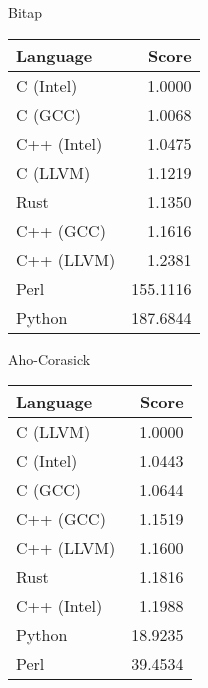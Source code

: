 \begin{subtable}{0.33\textwidth}
    \centering
    \caption{Bitap}
    \label{table:runtime:shift_or}
    \begin{tabular}{|l|r|}
        \hline
        Language & Score \\
        \hline
        C (Intel) & 1.0000 \\
        C (GCC) & 1.0068 \\
        C++ (Intel) & 1.0475 \\
        C (LLVM) & 1.1219 \\
        Rust & 1.1350 \\
        C++ (GCC) & 1.1616 \\
        C++ (LLVM) & 1.2381 \\
        Perl & 155.1116 \\
        Python & 187.6844 \\
        \hline
    \end{tabular}
\end{subtable}
\begin{subtable}{0.33\textwidth}
    \centering
    \caption{Aho-Corasick}
    \label{table:runtime:aho_corasick}
    \begin{tabular}{|l|r|}
        \hline
        Language & Score \\
        \hline
        C (LLVM) & 1.0000 \\
        C (Intel) & 1.0443 \\
        C (GCC) & 1.0644 \\
        C++ (GCC) & 1.1519 \\
        C++ (LLVM) & 1.1600 \\
        Rust & 1.1816 \\
        C++ (Intel) & 1.1988 \\
        Python & 18.9235 \\
        Perl & 39.4534 \\
        \hline
    \end{tabular}
\end{subtable}%
